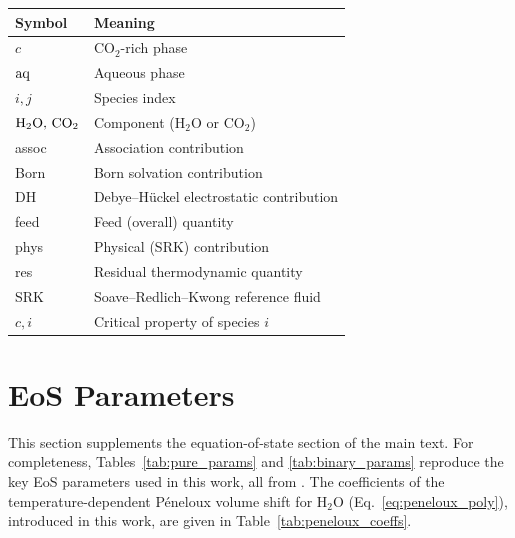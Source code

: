 \documentclass[preprint,12pt,number]{elsarticle}
\begin{document}
\begin{tabular}{@{}ll@{}}
  \toprule
  Symbol & Meaning \\
  \midrule
  $c$ & CO$_2$-rich phase \\
  ${\rm aq}$ & Aqueous phase \\
  $i, j$ & Species index \\
  ${\rm H_2O},\,{\rm CO_2}$ & Component (H$_2$O or CO$_2$) \\
  assoc & Association contribution \\
  Born & Born solvation contribution \\
  DH & Debye--Hückel electrostatic contribution \\
  feed & Feed (overall) quantity \\
  phys & Physical (SRK) contribution \\
  res & Residual thermodynamic quantity \\
  SRK & Soave--Redlich--Kwong reference fluid \\
  $c, i$ & Critical property of species $i$ \\
  \bottomrule
\end{tabular}

\section{EoS Parameters}
\label{sec:params}

This section supplements the equation-of-state section of the main text.
For completeness, Tables~\ref{tab:pure_params} and \ref{tab:binary_params} reproduce the
key EoS parameters used in this work, all from \citet{Coelho2025}.
The coefficients of the temperature-dependent Péneloux volume shift for H$_2$O
(Eq.~\ref{eq:peneloux_poly}), introduced in this work, are given in
Table~\ref{tab:peneloux_coeffs}.
\end{document}
